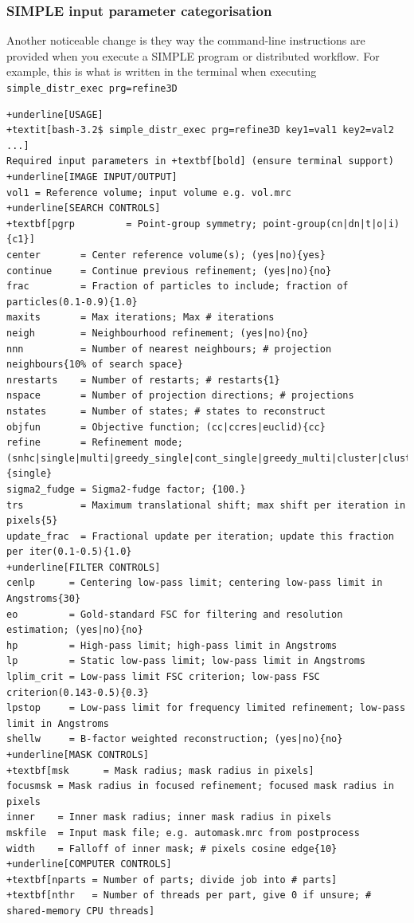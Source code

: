 \documentclass[a4paper,11pt]{article}
\begin{document}
\subsubsection{SIMPLE input parameter categorisation}
Another noticeable change is they way the command-line instructions are provided when you execute a SIMPLE program or distributed workflow. For example, this is what is written in the terminal when executing \texttt{simple\_distr\_exec prg=refine3D}
\begin{Verbatim}[commandchars=+\[\],fontsize=\small,breaklines=true]
+underline[USAGE]
+textit[bash-3.2$ simple_distr_exec prg=refine3D key1=val1 key2=val2 ...]
Required input parameters in +textbf[bold] (ensure terminal support)
+underline[IMAGE INPUT/OUTPUT]
vol1 = Reference volume; input volume e.g. vol.mrc
+underline[SEARCH CONTROLS]
+textbf[pgrp         = Point-group symmetry; point-group(cn|dn|t|o|i){c1}]
center       = Center reference volume(s); (yes|no){yes}
continue     = Continue previous refinement; (yes|no){no}
frac         = Fraction of particles to include; fraction of particles(0.1-0.9){1.0}
maxits       = Max iterations; Max # iterations
neigh        = Neighbourhood refinement; (yes|no){no}
nnn          = Number of nearest neighbours; # projection neighbours{10% of search space}
nrestarts    = Number of restarts; # restarts{1}
nspace       = Number of projection directions; # projections
nstates      = Number of states; # states to reconstruct
objfun       = Objective function; (cc|ccres|euclid){cc}
refine       = Refinement mode; (snhc|single|multi|greedy_single|cont_single|greedy_multi|cluster|clustersym){single}
sigma2_fudge = Sigma2-fudge factor; {100.}
trs          = Maximum translational shift; max shift per iteration in pixels{5}
update_frac  = Fractional update per iteration; update this fraction per iter(0.1-0.5){1.0}
+underline[FILTER CONTROLS]
cenlp      = Centering low-pass limit; centering low-pass limit in Angstroms{30}
eo         = Gold-standard FSC for filtering and resolution estimation; (yes|no){no}
hp         = High-pass limit; high-pass limit in Angstroms
lp         = Static low-pass limit; low-pass limit in Angstroms
lplim_crit = Low-pass limit FSC criterion; low-pass FSC criterion(0.143-0.5){0.3}
lpstop     = Low-pass limit for frequency limited refinement; low-pass limit in Angstroms
shellw     = B-factor weighted reconstruction; (yes|no){no}
+underline[MASK CONTROLS]
+textbf[msk      = Mask radius; mask radius in pixels]
focusmsk = Mask radius in focused refinement; focused mask radius in pixels
inner    = Inner mask radius; inner mask radius in pixels
mskfile  = Input mask file; e.g. automask.mrc from postprocess
width    = Falloff of inner mask; # pixels cosine edge{10}
+underline[COMPUTER CONTROLS]
+textbf[nparts = Number of parts; divide job into # parts]
+textbf[nthr   = Number of threads per part, give 0 if unsure; # shared-memory CPU threads]
\end{Verbatim}
\end{document}
